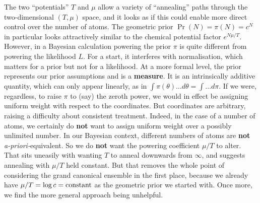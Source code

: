 {\jot
{}
}\vskip 4pt

The two ``potentials'' $T$ and $\mu$ allow a variety of ``annealing'' paths through the two-dimensional $(T,\mu)$ space,
and it looks as if this could enable more direct control over the number of atoms.
The geometric prior $\Pr(N) = \pi(N) = c^N$ in particular looks attractively similar to the chemical potential factor $e^{N \mu / T}$.
However, in a Bayesian calculation powering the prior $\pi$ is quite different from powering the likelihood $L$.
For a start, it interferes with normalisation, which matters for a prior but not for a likelihood.
At a more formal level, the prior represents our prior assumptions and is a {\bf measure}.
It is an intrinsically additive quantity, which can only appear linearly, as in $\int \pi(\theta)\ldots d\theta = \int\ldots d\pi$.
If we were, regardless, to raise $\pi$ to (say) the zeroth power, we would in effect be assigning uniform weight with respect to the coordinates.
But coordinates are arbitrary, raising a difficulty about consistent treatment.
Indeed, in the case of a number of atoms, we certainly do {\bf not} want to assign uniform weight over a possibly unlimited number.
In our Bayesian context, different numbers of atoms are {\bf not} {\it a-priori-}equivalent.
So we do {\bf not} want the powering coefficient $\mu/T$ to alter.
That sits uneasily with wanting $T$ to anneal downwards from $\infty$, and suggests annealing with $\mu/T$ held constant.
But that removes the whole point of considering the grand canonical ensemble in the first place,
because we already have $\mu/T = \log c = {\rm constant}$ as the geometric prior we started with.
Once more, we find the more general approach being unhelpful.

